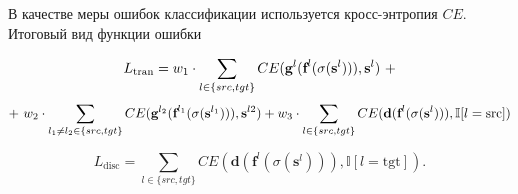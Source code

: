 \documentclass[12pt,twoside]{article}
\begin{document}
   В качестве меры ошибок классификации используется кросс-энтропия $CE$. Итоговый вид функции ошибки
   
   $$
   L_{\text{tran}} = w_1 \cdot \sum_{l \in \\ \{src, tgt\}} CE(\textbf{g}^{l}(\textbf{f}^{l}(\sigma(\mathbf{s}^{l}))), \mathbf{s}^{l})\ +
   $$
   $$
   +\ w_2 \cdot \sum_{l_1 \ne l_2 \in \\ \{src, tgt\}} CE(\textbf{g}^{l_2}(\textbf{f}^{l_1}(\sigma(\mathbf{s}^{l_1}))), \mathbf{s}^{l2}) +
   w_3 \cdot \sum_{l \in \\ \{src, tgt\}} CE(\textbf{d}(\textbf{f}^{l}(\sigma(\mathbf{s}^{l}))), \mathbb{I}[l = \text{src}])
   $$
   
   $$
   L_{\text{disc}} = \sum_{l \in \{src, tgt\}} CE(\textbf{d}(\textbf{f}^{l}(\sigma(\mathbf{s}^{l}))), \mathbb{I}[l = \text{tgt}]).
   $$
   
    
   
   
   
    


  
  
\end{document}
